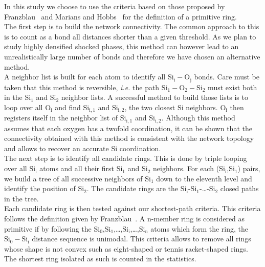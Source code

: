 \documentclass[aps,10pt,twocolumn]{revtex4}
\makeatletter
\newcommand{\ie}{\emph{i.e.}\@\xspace}
\newcommand{\mrm}[1]{\ensuremath{\mathrm{#1}}\xspace}
\makeatother
\begin{document}
In this study we choose to use the criteria based on those proposed by
Franzblau~\cite{Franzblau91} and Marians and Hobbs~\cite{MariansHobbs90} for the definition of a
primitive ring.\\
The first step is to build the network connectivity. The common approach to this is to count as
a bond all distances shorter than a given threshold. As we plan to study highly
densified shocked phases, this method can however lead to an unrealistically large number of
bonds and therefore we have chosen an alternative method.\\
A neighbor list is built for each atom to
identify all \mrm{Si_i-O_j} bonds. Care must be taken that this method is reversible, \ie
the path \mrm{Si_1-O_2-Si_2} must exist both in the \mrm{Si_1} and \mrm{Si_2} neighbor
lists.
A successful method to build those lists is to loop over all \mrm{O_i} and find \mrm{Si_{i,1}}
and \mrm{Si_{i,2}}, the two closest \mrm{Si} neighbors. \mrm{O_i} then registers itself in the
neighbor list of \mrm{Si_{i,1}} and \mrm{Si_{i,2}}. Although this method assumes
that each oxygen has a twofold coordination, it can be shown that the
connectivity obtained with this method is consistent with the network topology and allows to
recover an accurate Si coordination.\\
The next step is to identify all candidate rings. This is
done by triple looping over all \mrm{Si_i} atoms and all their first \mrm{Si_{1}} and
\mrm{Si_{2}} neighbors. For each (\mrm{Si_i},\mrm{Si_{1}}) pairs, we build a tree of all
successive neighbors of \mrm{Si_1} down to the eleventh level and identify the position of
\mrm{Si_2}. The candidate rings are the \mrm{Si_i}-\mrm{Si_1}-\ldots-\mrm{Si_2} closed paths in
the tree.\\ 
Each candidate ring is then tested against our shortest-path criteria. This criteria follows the
definition given by Franzblau~\cite{Franzblau91}. A n-member ring is considered as primitive if
by following the \mrm{Si_0},\mrm{Si_1},\ldots,\mrm{Si_i},\ldots,\mrm{Si_n} atoms which form the
ring, the \mrm{Si_0-Si_i} distance sequence is unimodal. This criteria allows to remove all rings whose
shape is not convex such as eight-shaped or tennis racket-shaped rings. The shortest ring
isolated as such is counted in the statistics.\\  
\end{document}
